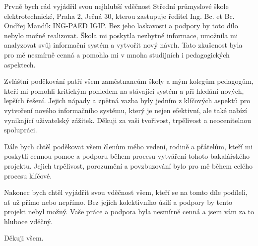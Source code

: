 \documentclass[FM,Proj]{tulthesis}
\begin{document}
\begin{acknowledgement}
Prvně bych rád vyjádřil svou nejhlubší vděčnost Střední průmyslové
škole elektrotechnické, Praha 2, Ječná 30, kterou zastupuje 
ředitel Ing. Bc. et Bc. Ondřej Mandík ING-PAED IGIP. Bez 
jeho laskavosti a podpory by toto dílo nebylo možné realizovat. 
Škola mi poskytla nezbytné informace, umožnila mi analyzovat svůj 
informační systém a vytvořit nový návrh. Tato zkušenost byla pro mě 
nesmírně cenná a pomohla mi v mnoha studijních i pedagogických aspektech.

Zvláštní poděkování patří všem zaměstnancům školy a mým kolegům 
pedagogům, kteří mi pomohli kritickým pohledem na stávající 
systém a při hledání nových, lepších řešení. Jejich nápady a 
zpětná vazba byly jedním z klíčových aspektů pro vytvoření nového 
informačního systému, který je nejen efektivní, ale také nabízí 
vynikající uživatelský zážitek. Děkuji za vaši tvořivost, 
trpělivost a neocenitelnou spolupráci.

Dále bych chtěl poděkovat všem členům mého vedení, rodině a 
přátelům, kteří mi poskytli cennou pomoc a podporu během procesu 
vytváření tohoto bakalářského projektu. Jejich trpělivost, 
porozumění a povzbuzování bylo pro mě během celého procesu klíčové.

Nakonec bych chtěl vyjádřit svou vděčnost všem, kteří se na tomto 
díle podíleli, ať už přímo nebo nepřímo. Bez jejich kolektivního 
úsilí a podpory by tento projekt nebyl možný. Vaše práce a podpora
byla nesmírně cenná a jsem vám za to hluboce vděčný.

Děkuji všem.
\end{acknowledgement}

\tableofcontents

\clearpage
\end{document}
